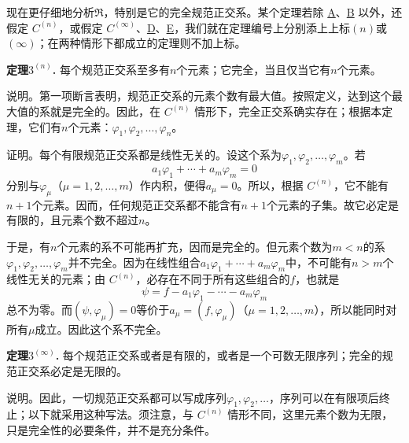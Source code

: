 \documentclass[fontsize=13pt,twoside,openany,headings=normal,parskip=false,bookmarkpackage=false,DIV=calc]{scrbook}
\newcommand{\textkaishu}[1]{{\zhkaishu #1}}
\begin{document}
现在更仔细地分析$\mathfrak{R}$，特别是它的完全规范正交系。某个定理若除 \hyperref[ax:II.A]{A}、\hyperref[ax:II.B]{B} 以外，还假定 \hyperref[ax:II.Cn]{$C^{(n)}$}，或假定 \hyperref[ax:II.Cinfty]{$C^{(\infty)}$}、\hyperref[ax:II.D]{D}、\hyperref[ax:II.E]{E}，我们就在定理编号上分别添上上标$(n)$或$(\infty)$；在两种情形下都成立的定理则不加上标。

\leavevmode{}\textbf{定理$3^{(n)}$.}\label{thm:II.3n} 每个规范正交系至多有$n$个元素；它完全，当且仅当它有$n$个元素。

\textkaishu{说明。}第一项断言表明，规范正交系的元素个数有最大值。按照定义，达到这个最大值的系就是完全的。因此，在 \hyperref[ax:II.Cn]{$C^{(n)}$} 情形下，完全正交系确实存在；根据本定理，它们有$n$个元素：$\varphi_1,\allowbreak \varphi_2,\allowbreak \ldots,\allowbreak \varphi_n$。

\textkaishu{证明。}每个有限规范正交系都是线性无关的。设这个系为$\varphi_1,\allowbreak \varphi_2,\allowbreak \ldots,\allowbreak \varphi_m$。若
\[
a_1\varphi_1+\cdots+a_m\varphi_m=0
\]
分别与$\varphi_\mu$（$\mu=1,\allowbreak 2,\allowbreak \ldots,\allowbreak m$）作内积，便得$a_\mu=0$。所以，根据 \hyperref[ax:II.Cn]{$C^{(n)}$}，它不能有$n+1$个元素。因而，任何规范正交系都不能含有$n+1$个元素的子集。故它必定是有限的，且元素个数不超过$n$。

\hypertarget{origpage-26}{}\label{origpage-26}于是，有$n$个元素的系不可能再扩充，因而是完全的。但元素个数为$m<n$的系$\varphi_1,\allowbreak \varphi_2,\allowbreak \ldots,\allowbreak \varphi_m$并不完全。因为在线性组合$a_1\varphi_1+\cdots+a_m\varphi_m$中，不可能有$n>m$个线性无关的元素；由 \hyperref[ax:II.Cn]{$C^{(n)}$}，必存在不同于所有这些组合的$f$，也就是
\[
\psi=f-a_1\varphi_1-\cdots-a_m\varphi_m
\]
总不为零。而$(\psi,\allowbreak \varphi_\mu)=0$等价于$a_\mu=(f,\allowbreak \varphi_\mu)$（$\mu=1,\allowbreak 2,\allowbreak \ldots,\allowbreak m$），所以能同时对所有$\mu$成立。因此这个系不完全。

\leavevmode{}\textbf{定理$3^{(\infty)}$.}\label{thm:II.3infty} 每个规范正交系或者是有限的，或者是一个可数无限序列；完全的规范正交系必定是无限的。

\textkaishu{说明。}因此，一切规范正交系都可以写成序列$\varphi_1,\allowbreak \varphi_2,\allowbreak \ldots$，序列可以在有限项后终止；以下就采用这种写法。须注意，与 \hyperref[ax:II.Cn]{$C^{(n)}$} 情形不同，这里元素个数为无限，只是完全性的必要条件，并不是充分条件。
\end{document}
